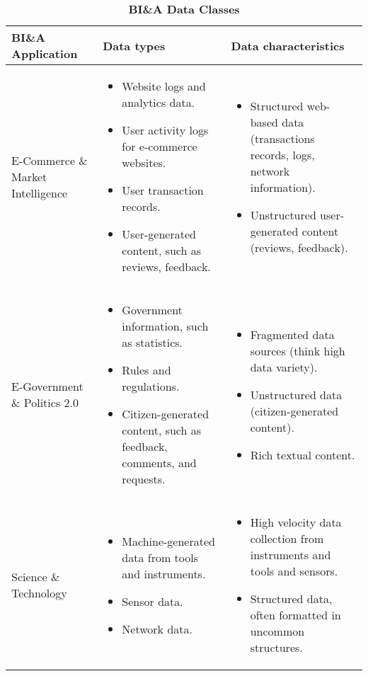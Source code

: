 \begin{landscape}

\begin{table}[H]
\footnotesize
\centering
\caption{\textbf{BI\&A Data Classes}}
\label{tab:bia_data_tab}

\begin{tabular}{ | p{4cm} | p{10cm} | p{10cm} | }

\hline
\textbf{BI\&A Application} & \textbf{Data types} & \textbf{Data characteristics} \\ \hline

E-Commerce \& Market Intelligence
&
\begin{itemize}[leftmargin=*]
  \item Website logs and analytics data.
  \item User activity logs for e-commerce websites.
  \item User transaction records.
  \item User-generated content, such as reviews, feedback.
\end{itemize}
&
\begin{itemize}[leftmargin=*]
  \item Structured web-based data (transactions records, logs, network information).
  \item Unstructured user-generated content (reviews, feedback).
\end{itemize}
\\ \hline

E-Government \& Politics 2.0
&
\begin{itemize}[leftmargin=*]
  \item Government information, such as statistics.
  \item Rules and regulations.
  \item Citizen-generated content, such as feedback, comments, and requests.
\end{itemize}
&
\begin{itemize}[leftmargin=*]
  \item Fragmented data sources (think high data variety).
  \item Unstructured data (citizen-generated content).
  \item Rich textual content.
\end{itemize}
\\ \hline

Science \& Technology
&
\begin{itemize}[leftmargin=*]
  \item Machine-generated data from tools and instruments.
  \item Sensor data.
  \item Network data.
\end{itemize}
&
\begin{itemize}[leftmargin=*]
  \item High velocity data collection from instruments and tools and sensors.
  \item Structured data, often formatted in uncommon structures.
\end{itemize}
\\ \hline


\end{tabular}
\end{table}
\end{landscape}
